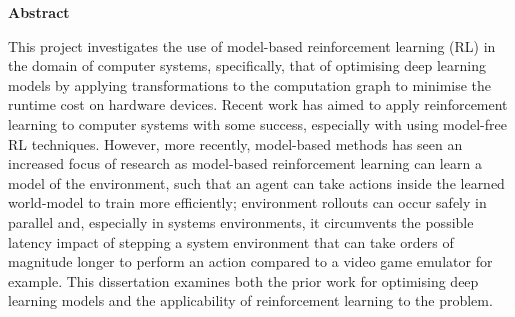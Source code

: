 \newpage
{\Huge \bf Abstract}
\vspace{24pt} 

This project investigates the use of model-based reinforcement learning (RL) in the domain of computer systems, specifically, that of optimising deep learning models by applying transformations to the computation graph to minimise the runtime cost on hardware devices. Recent work has aimed to apply reinforcement learning to computer systems with some success, especially with using model-free RL techniques. However, more recently, model-based methods has seen an increased focus of research as model-based reinforcement learning can learn a model of the environment, such that an agent can take actions inside the learned world-model to train more efficiently; environment rollouts can occur safely in parallel and, especially in systems environments, it circumvents the possible latency impact of stepping a system environment that can take orders of magnitude longer to perform an action compared to a video game emulator for example. This dissertation examines both the prior work for optimising deep learning models and the applicability of reinforcement learning to the problem.

\vspace*{\fill}
